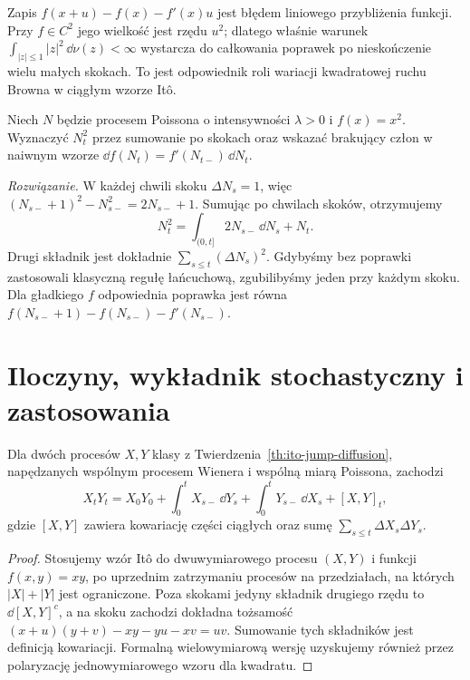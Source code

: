 \begin{uwaga}
Zapis $f(x+u)-f(x)-f'(x)u$ jest błędem liniowego
przybliżenia funkcji. Przy $f\in C^2$ jego wielkość jest
rzędu $u^2$; dlatego właśnie warunek
$\int_{|z|\le1}|z|^2\,\dd\nu(z)<\infty$
wystarcza do całkowania poprawek po nieskończenie wielu
małych skokach. To jest odpowiednik roli wariacji
kwadratowej ruchu Browna w ciągłym wzorze Itô.
\end{uwaga}

\begin{zadanie}
Niech $N$ będzie procesem Poissona o intensywności
$\lambda>0$ i $f(x)=x^2$. Wyznaczyć $N_t^2$ przez
sumowanie po skokach oraz wskazać brakujący człon
w naiwnym wzorze $\dd f(N_t)=f'(N_{t-})\,\dd N_t$.

\emph{Rozwiązanie.} W każdej chwili skoku $\Delta N_s=1$,
więc $(N_{s-}+1)^2-N_{s-}^2=2N_{s-}+1$.
Sumując po chwilach skoków, otrzymujemy
\[
N_t^2=\int_{(0,t]}2N_{s-}\,\dd N_s+N_t.
\]
Drugi składnik jest dokładnie
$\sum_{s\le t}(\Delta N_s)^2$.
Gdybyśmy bez poprawki zastosowali klasyczną
regułę łańcuchową, zgubilibyśmy jeden przy każdym skoku.
Dla gładkiego $f$ odpowiednia poprawka jest równa
$f(N_{s-}+1)-f(N_{s-})-f'(N_{s-})$.
\end{zadanie}

\section{Iloczyny, wykładnik stochastyczny i zastosowania}

\begin{wniosek}
\label{cor:jump-product}
Dla dwóch procesów $X,Y$ klasy z
Twierdzenia~\ref{th:ito-jump-diffusion}, napędzanych
wspólnym procesem Wienera i wspólną miarą Poissona,
zachodzi
\[
X_tY_t=X_0Y_0+\int_0^tX_{s-}\,\dd Y_s
+\int_0^tY_{s-}\,\dd X_s+[X,Y]_t,
\]
gdzie $[X,Y]$ zawiera kowariację części ciągłych
oraz sumę $\sum_{s\le t}\Delta X_s\Delta Y_s$.
\end{wniosek}
\begin{proof}
Stosujemy wzór Itô do dwuwymiarowego procesu
$(X,Y)$ i funkcji $f(x,y)=xy$, po uprzednim zatrzymaniu
procesów na przedziałach, na których $|X|+|Y|$ jest
ograniczone. Poza skokami jedyny składnik drugiego
rzędu to $\dd[X,Y]^c$, a na skoku zachodzi dokładna
tożsamość
$(x+u)(y+v)-xy-yu-xv=uv$.
Sumowanie tych składników jest definicją kowariacji.
Formalną wielowymiarową wersję uzyskujemy również
przez polaryzację jednowymiarowego wzoru dla kwadratu.
\end{proof}

